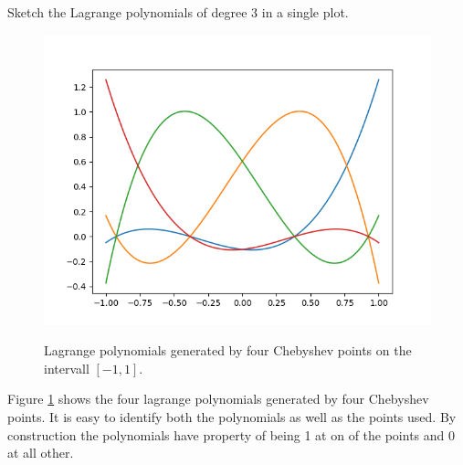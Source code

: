\begin{problem}
Sketch the Lagrange polynomials of degree 3 in a single plot.
\end{problem}


\begin{solution}
  \begin{figure}[!ht]
    \centering
    \includegraphics[scale = 0.5]{./code/task_3.png}
    \label{fig:task_3}
    \caption{Lagrange polynomials generated by four Chebyshev points on
        the intervall $[-1, 1]$.}
  \end{figure}
Figure \ref{fig:task_3} shows the four lagrange polynomials generated
by four Chebyshev points. It is easy to identify both the polynomials
as well as the points used. By construction the polynomials have
property of being 1 at on of the points and 0 at all other.
\end{solution}

